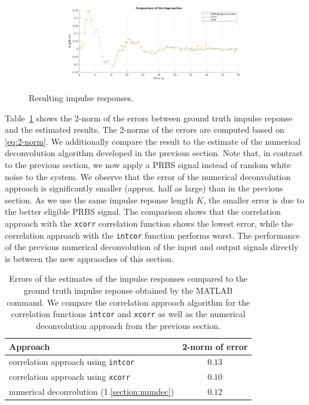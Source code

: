 \documentclass{scrartcl}
\begin{document}
\begin{figure}[h]
\begin{subfigure}{0.49\textwidth}
		\label{fig:impulse_response_xcorr}
	\end{subfigure}
	\begin{subfigure}{\textwidth}
		\includegraphics[width=\textwidth]{figures/impulse_response_comparison.pdf}
		\label{fig:impulse_response_comparison}
	\end{subfigure}
	\caption{Resulting impulse responses.}\label{fig:correlation_impulse_responses}
\end{figure}

Table~\ref{tab:correlation_appraoch_errors} shows the 2-norm of the errors between ground truth impulse reponse and the estimated results.
The 2-norms of the errors are computed based on \eqref{eq:2-norm}.
We additionally compare the result to the estimate of the numerical deconvolution algorithm developed in the previous section.
Note that, in contrast to the previous section, we now apply a PRBS signal instead of random white noise to the system.
We observe that the error of the numerical deconvolution approach is significantly smaller (approx. half as large) than in the previous section. 
As we use the same impulse reponse length $K$, the smaller error is due to the better eligible PRBS signal.
The comparison shows that the correlation approach with the \texttt{xcorr} correlation function shows the lowest error, while the correlation approach with the \texttt{intcor} function performs worst.
The performance of the previous numerical deconvolution of the input and output signals directly is between the new appraoches of this section.

\begin{table}[h]
	\centering

	\begin{tabular}{l|c}
	\hline
	\hline
	\textbf{Approach} & \textbf{2-norm of error}\\
	\hline
		correlation approach using \texttt{intcor} & $0.13$ \\
		correlation approach using \texttt{xcorr} & $0.10$ \\\hline
		numerical deconvolution (1.\ref{section:numdec}) & $0.12$\\
	\hline
	\hline
	\end{tabular}
	\caption{Errors of the estimates of the impulse responses compared to the ground truth impulse reponse obtained by the MATLAB command. We compare the correlation approach algorithm for the correlation functions \texttt{intcor} and \texttt{xcorr} as well as the numerical deconvolution approach from the previous section.}
	\label{tab:correlation_appraoch_errors}
\end{table}
\end{document}

